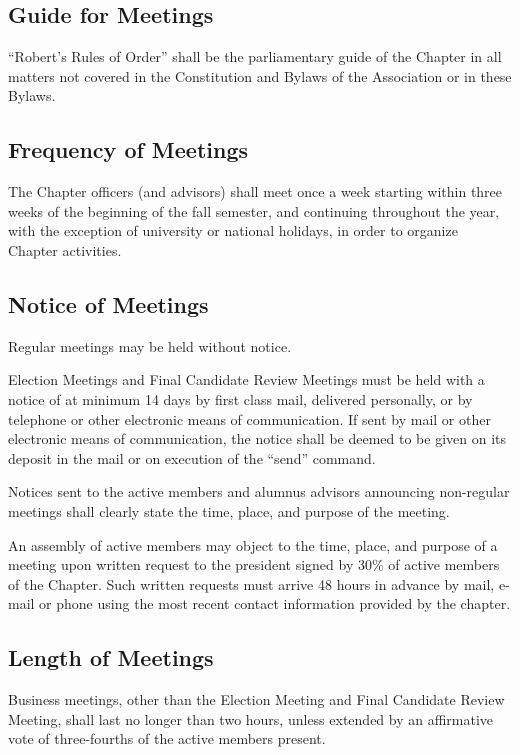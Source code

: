\documentclass{article}
\begin{document}
	\subsection{Guide for Meetings}
	``Robert's Rules of Order'' shall be the parliamentary guide of the Chapter in all matters not covered in the Constitution and Bylaws of the Association or in these Bylaws.
	
	\subsection{Frequency of Meetings}	
	The Chapter officers (and advisors) shall meet once a week starting within three weeks of the beginning of the fall semester, and continuing throughout the year, with the exception of university or national holidays, in order to organize Chapter activities.
	
	\subsection{Notice of Meetings}
	Regular meetings may be held without notice.
	
	Election Meetings and Final Candidate Review Meetings must be held with a notice of at minimum 14 days by first class mail, delivered personally, or by telephone or other electronic means of communication. If sent by mail or other electronic means of communication, the notice shall be deemed to be given on its deposit in the mail or on execution of the ``send'' command.
	
	Notices sent to the active members and alumnus advisors announcing non-regular meetings shall clearly state the time, place, and purpose of the meeting.
	
	An assembly of active members may object to the time, place, and purpose of a meeting upon written request to the president signed by 30\% of active members of the Chapter. Such written requests must arrive 48 hours in advance by mail, e-mail or phone using the most recent contact information provided by the chapter.
	
	\subsection{Length of Meetings}
	Business meetings, other than the Election Meeting and Final Candidate Review Meeting, shall last no longer than two hours, unless extended by an affirmative vote of three-fourths of the active members present.
	
\end{document}
